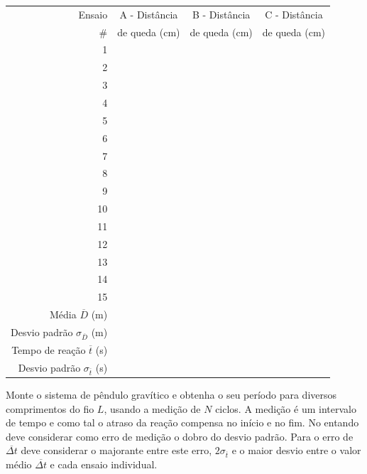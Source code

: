 \documentclass[a4paper,12pt]{article}      %
\begin{document}
\begin{center}
\begin{footnotesize}
\begin{tabular}{|r|c|c|c|}
\hline
Ensaio  & A - Distância & B - Distância & C - Distância  \\
\# & de queda (cm) & de queda (cm) & de queda (cm)\\
\hline \hline
1 & & & \\
\hline
2 & &  &\\
\hline 3 & & & \\
\hline 4 & & & \\
\hline 5 & & & \\
\hline 6 & & & \\
\hline 7 & & & \\
\hline 8 & & & \\
\hline 9 & & & \\
\hline 10 & & & \\
\hline 11 & & & \\
\hline 12 & & & \\
\hline 13 & & & \\
\hline 14 & & & \\
\hline 15 & & & \\
\hline \hline
Média $\overline{D}$ (m) & &  & \\ \hline
Desvio padrão  $\sigma_{\overline{D}}$ (m) & & & \\ \hline
Tempo de reação $\overline{t}$ (s) & & & \\ \hline %
Desvio padrão  $\sigma_{\overline{t}}$ (s) & & & \\
\hline

\end{tabular}
\end{footnotesize}
\end{center}


Monte o sistema de pêndulo gravítico e obtenha o seu período para diversos comprimentos do fio $L$, usando a medição de $N$ ciclos. 
A medição é um intervalo de tempo e como tal o atraso da reação compensa no início e no fim. No entando deve considerar como  
erro de medição o dobro do desvio padrão. Para o erro de $\overline{\Delta t}$ deve considerar o majorante entre este erro, $2 \sigma_{\overline{t}}$ e o maior desvio entre o valor médio $\overline{\Delta  t} $ e cada ensaio individual. 
\end{document}
